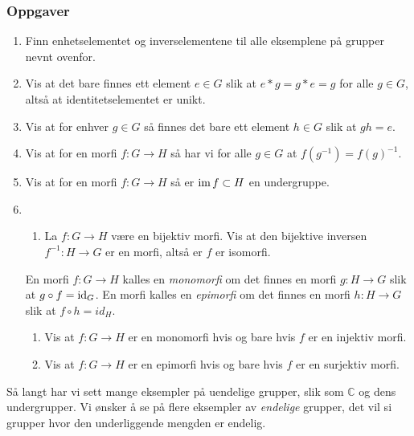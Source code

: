 \subsubsection*{Oppgaver}
\begin{enumerate}
    \item Finn enhetselementet og inverselementene til alle eksemplene på
        grupper nevnt ovenfor.
    \item Vis at det bare finnes ett element $e\in G$ slik
        at $e \ast g = g\ast e = g$ for alle $g\in G$,
        altså at identitetselementet er unikt.
    \item Vis at for enhver $g\in G$ så finnes det bare ett element
        $h\in G$ slik at $gh = e$.
    \item Vis at for en morfi $f\colon G\to H$
        så har vi for alle $g\in G$ at $f(g^{-1}) = {f(g)}^{-1}$.
    \item Vis at for en morfi $f\colon G\to H$ så er $\operatorname{im} f\subset H$ en undergruppe.
    \item
        \begin{enumerate}
            \item La $f\colon G\to H$ være en bijektiv morfi.
                Vis at den bijektive inversen $f^{-1}\colon H\to G$
                er en morfi, altså er $f$ er isomorfi.
        \end{enumerate}
        En morfi $f\colon G\to H$ kalles en \textit{monomorfi}
        om det finnes en morfi $g\colon H\to G$ slik at $g\circ f=\operatorname{id}_G$.
        En morfi kalles en \textit{epimorfi} om det finnes en morfi
        $h\colon H\to G$ slik at $f\circ h = id_H$.
        \begin{enumerate}[resume]
            \item Vis at $f\colon G\to H$ er en monomorfi hvis og bare hvis $f$
                er en injektiv morfi.
            \item Vis at $f\colon G\to H$ er en epimorfi hvis og bare hvis $f$
                er en surjektiv morfi.
        \end{enumerate}
\end{enumerate}
Så langt har vi sett mange eksempler på uendelige grupper,
slik som $\mathbb C$ og dens undergrupper.
Vi ønsker å se på flere eksempler av \textit{endelige} grupper,
det vil si grupper hvor den underliggende mengden er endelig.
